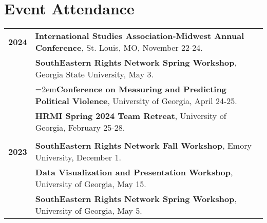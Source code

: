 \documentclass[letterpaper,12pt]{article}
\begin{document}
\section{Event Attendance}
\begin{xltabular}{\dimexpr\textwidth-0in}{p{.85in}X}
\textbf{2024} & \textbf{International Studies Association-Midwest Annual Conference}, St. Louis, MO, November 22-24.\\
                     &  \textbf{SouthEastern Rights Network Spring Workshop}, Georgia State University, May 3.\\
                     &  \hangindent=2em\textbf{Conference on Measuring and Predicting Political Violence}, University of Georgia, April 24-25.\\
                     &  \textbf{HRMI Spring 2024 Team Retreat}, University of Georgia, February 25-28.\\ \\
\textbf{2023} &  \textbf{SouthEastern Rights Network Fall Workshop}, Emory University, December 1.\\
                     &  \textbf{Data Visualization and Presentation Workshop}, University of Georgia, May 15.\\
                     &  \textbf{SouthEastern Rights Network Spring Workshop}, University of Georgia, May 5.
\end{xltabular}

\end{document}
